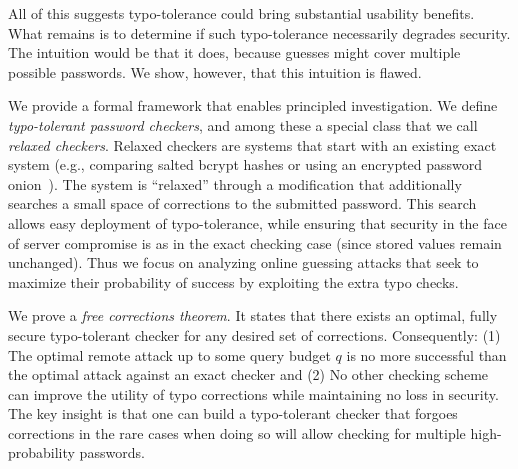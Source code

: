 
All of this suggests typo-tolerance could bring substantial usability benefits.
What remains is to determine if such typo-tolerance necessarily degrades
security. The intuition would be that it does, because guesses might cover
multiple possible passwords. We show, however, that this intuition is flawed.


We provide a formal framework that enables principled investigation. We define
\emph{typo-tolerant password checkers}, and among these a special class that we call 
\emph{relaxed checkers}. Relaxed checkers are systems that start with an existing exact
system (e.g., comparing salted bcrypt hashes or using an
encrypted password onion~\cite{everspaugh2015pythia}). The system is ``relaxed'' through a modification that additionally searches a small space of corrections  to the submitted password. This search allows easy deployment of
typo-tolerance, while ensuring that security in the face of server compromise
is as in the exact checking case (since stored values remain
unchanged). Thus we focus on analyzing online guessing attacks that
seek to maximize their probability of success 
by exploiting the extra typo checks.


We prove a \emph{free corrections theorem}. It states that there exists an
optimal, fully secure typo-tolerant checker for any desired set of
corrections. Consequently: (1) The optimal remote attack up to some query
budget $q$ is
no more successful than the optimal attack against an exact checker and (2) No other
checking scheme can improve the utility of typo corrections while maintaining no
loss in security.  The key insight is that one can build a typo-tolerant checker
that forgoes corrections in the rare cases when doing so will allow checking for
multiple high-probability passwords.

